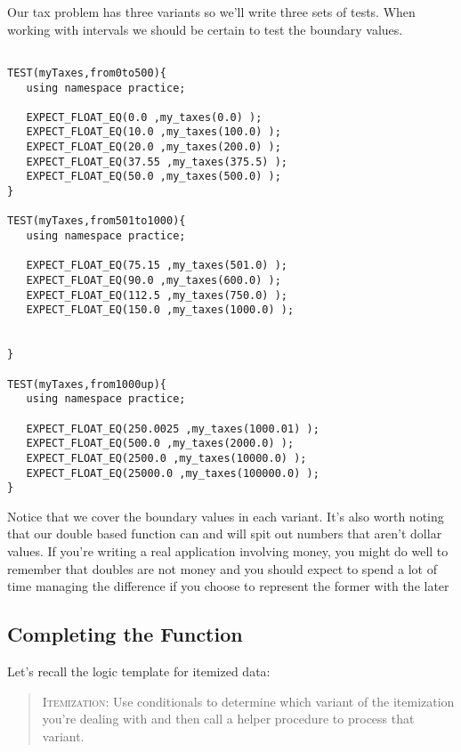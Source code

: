 \documentclass[]{tufte-handout}
\begin{document}
Our tax problem has three variants so we'll write three sets of tests. When working with intervals we should be certain to test the boundary values.
\begin{verbatim}

TEST(myTaxes,from0to500){
   using namespace practice;
   
   EXPECT_FLOAT_EQ(0.0 ,my_taxes(0.0) );  
   EXPECT_FLOAT_EQ(10.0 ,my_taxes(100.0) );
   EXPECT_FLOAT_EQ(20.0 ,my_taxes(200.0) );
   EXPECT_FLOAT_EQ(37.55 ,my_taxes(375.5) );   
   EXPECT_FLOAT_EQ(50.0 ,my_taxes(500.0) );  
}

TEST(myTaxes,from501to1000){
   using namespace practice;

   EXPECT_FLOAT_EQ(75.15 ,my_taxes(501.0) );  
   EXPECT_FLOAT_EQ(90.0 ,my_taxes(600.0) );
   EXPECT_FLOAT_EQ(112.5 ,my_taxes(750.0) );
   EXPECT_FLOAT_EQ(150.0 ,my_taxes(1000.0) );   

   
}

TEST(myTaxes,from1000up){
   using namespace practice;

   EXPECT_FLOAT_EQ(250.0025 ,my_taxes(1000.01) );  
   EXPECT_FLOAT_EQ(500.0 ,my_taxes(2000.0) );
   EXPECT_FLOAT_EQ(2500.0 ,my_taxes(10000.0) );
   EXPECT_FLOAT_EQ(25000.0 ,my_taxes(100000.0) );      
}
\end{verbatim}

Notice that we cover the boundary values in each variant. It's also worth noting that our double based function can and will spit out numbers that aren't dollar values.  If you're writing a real application involving money, you might do well to remember that doubles are not money and you should expect to spend a lot of time managing the difference if you choose to represent the former with the later

\subsection{Completing the Function}

Let's recall the logic template for itemized data:
\begin{quote}
\textsc{Itemization}: Use conditionals to determine which variant of the itemization you're dealing with and then call  a helper procedure to process that variant.
\end{quote}
\end{document}
